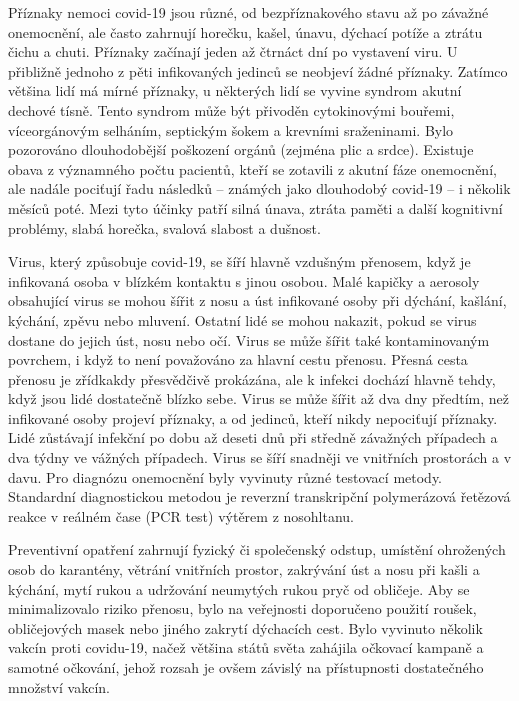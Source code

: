 \documentclass[a4paper, 12pt]{article}
\begin{document}
Příznaky nemoci covid-19 jsou různé, od bezpříznakového stavu až po závažné onemocnění, ale často zahrnují horečku, kašel, únavu, dýchací potíže a ztrátu čichu a chuti. Příznaky začínají jeden až čtrnáct dní po vystavení viru. U přibližně jednoho z pěti infikovaných jedinců se neobjeví žádné příznaky. Zatímco většina lidí má mírné příznaky, u některých lidí se vyvine syndrom akutní dechové tísně. Tento syndrom může být přivoděn cytokinovými bouřemi, víceorgánovým selháním, septickým šokem a krevními sraženinami. Bylo pozorováno dlouhodobější poškození orgánů (zejména plic a srdce). Existuje obava z významného počtu pacientů, kteří se zotavili z akutní fáze onemocnění, ale nadále pociťují řadu následků – známých jako dlouhodobý covid-19 – i několik měsíců poté. Mezi tyto účinky patří silná únava, ztráta paměti a další kognitivní problémy, slabá horečka, svalová slabost a dušnost.

Virus, který způsobuje covid-19, se šíří hlavně vzdušným přenosem, když je infikovaná osoba v blízkém kontaktu s jinou osobou. Malé kapičky a aerosoly obsahující virus se mohou šířit z nosu a úst infikované osoby při dýchání, kašlání, kýchání, zpěvu nebo mluvení. Ostatní lidé se mohou nakazit, pokud se virus dostane do jejich úst, nosu nebo očí. Virus se může šířit také kontaminovaným povrchem, i když to není považováno za hlavní cestu přenosu. Přesná cesta přenosu je zřídkakdy přesvědčivě prokázána, ale k infekci dochází hlavně tehdy, když jsou lidé dostatečně blízko sebe. Virus se může šířit až dva dny předtím, než infikované osoby projeví příznaky, a od jedinců, kteří nikdy nepociťují příznaky. Lidé zůstávají infekční po dobu až deseti dnů při středně závažných případech a dva týdny ve vážných případech. Virus se šíří snadněji ve vnitřních prostorách a v davu. Pro diagnózu onemocnění byly vyvinuty různé testovací metody. Standardní diagnostickou metodou je reverzní transkripční polymerázová řetězová reakce v reálném čase (PCR test) výtěrem z nosohltanu.

Preventivní opatření zahrnují fyzický či společenský odstup, umístění ohrožených osob do karantény, větrání vnitřních prostor, zakrývání úst a nosu při kašli a kýchání, mytí rukou a udržování neumytých rukou pryč od obličeje. Aby se minimalizovalo riziko přenosu, bylo na veřejnosti doporučeno použití roušek, obličejových masek nebo jiného zakrytí dýchacích cest. Bylo vyvinuto několik vakcín proti covidu-19, načež většina států světa zahájila očkovací kampaně a samotné očkování, jehož rozsah je ovšem závislý na přístupnosti dostatečného množství vakcín.
\end{document}
